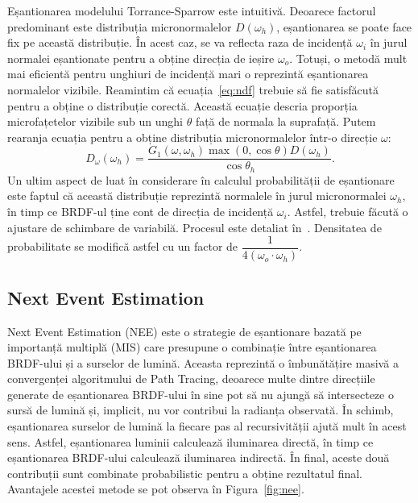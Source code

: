 \documentclass[12pt,a4paper]{report}
\numberwithin{equation}{section} %
\begin{document}
Eșantionarea modelului Torrance-Sparrow este intuitivă. Deoarece factorul
predominant este distribuția micronormalelor $D(\omega_h)$, eșantionarea
se poate face fix pe această distribuție. În acest caz, se va reflecta
raza de incidență $\omega_i$ în jurul normalei eșantionate pentru a obține
direcția de ieșire $\omega_o$. Totuși, o metodă mult mai eficientă pentru 
unghiuri de incidență mari o reprezintă eșantionarea normalelor vizibile.
Reamintim că ecuația~\ref{eq:ndf} trebuie să fie satisfăcută pentru a obține
o distribuție corectă. Această ecuație descria proporția microfațetelor vizibile
sub un unghi $\theta$ față de normala la suprafață. Putem rearanja ecuația
pentru a obține distribuția micronormalelor într-o direcție $\omega$:
\begin{equation}
	D_{\omega}(\omega_h) = \frac{G_1(\omega, \omega_h)\max(0, \cos \theta)D(\omega_h)}{\cos \theta_h}.
\end{equation}
Un ultim aspect de luat în considerare în calculul probabilității de eșantionare
este faptul că această distribuție reprezintă normalele în jurul micronormalei $\omega_h$,
în timp ce BRDF-ul ține cont de direcția de incidență $\omega_i$. Astfel, trebuie făcută
o ajustare de schimbare de variabilă. Procesul este detaliat în~\cite{PbrBookNdf}.
Densitatea de probabilitate se modifică astfel cu un factor de $\dfrac{1}{4(\omega_o \cdot \omega_h)}$.

\subsection{Next Event Estimation}

Next Event Estimation (NEE) este o strategie de eșantionare bazată pe importanță
multiplă (MIS) care presupune o combinație între eșantionarea BRDF-ului și a
surselor de lumină. Aceasta reprezintă o îmbunătățire masivă a convergenței
algoritmului de Path Tracing, deoarece multe dintre direcțiile generate de
eșantionarea BRDF-ului în sine pot să nu ajungă să intersecteze o sursă de lumină
și, implicit, nu vor contribui la radianța observată. În schimb, eșantionarea
surselor de lumină la fiecare pas al recursivității ajută mult în acest sens.
Astfel, eșantionarea luminii calculează iluminarea directă, în timp ce eșantionarea
BRDF-ului calculează iluminarea indirectă. În final, aceste două contribuții
sunt combinate probabilistic pentru a obține rezultatul final. Avantajele acestei
metode se pot observa în Figura~\ref{fig:nee}.
\end{document}
